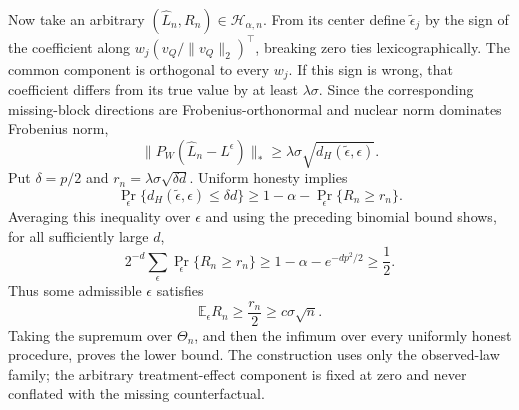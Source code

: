 Now take an arbitrary \((\widehat L_n,R_n)\in\mathcal H_{\alpha,n}\).  From its center define \(\widetilde\epsilon_j\) by the sign of the coefficient along
\(w_j(v_Q/\lVert v_Q\rVert_2)^{\top}\), breaking zero ties lexicographically.  The common component is orthogonal to every \(w_j\).  If this sign is wrong, that coefficient differs from its true value by at least \(\lambda\sigma\).  Since the corresponding missing-block directions are Frobenius-orthonormal and nuclear norm dominates Frobenius norm,
\[
\lVert P_W(\widehat L_n-L^\epsilon)\rVert_*
\ge\lambda\sigma\sqrt{d_H(\widetilde\epsilon,\epsilon)}.
\]
Put \(\delta=p/2\) and \(r_n=\lambda\sigma\sqrt{\delta d}\).  Uniform honesty implies
\[
\Pr_\epsilon\{d_H(\widetilde\epsilon,\epsilon)\le\delta d\}
\ge1-\alpha-\Pr_\epsilon\{R_n\ge r_n\}.
\]
Averaging this inequality over \(\epsilon\) and using the preceding binomial bound shows, for all sufficiently large \(d\),
\[
2^{-d}\sum_\epsilon\Pr_\epsilon\{R_n\ge r_n\}
\ge1-\alpha-e^{-dp^2/2}\ge\frac12.
\]
Thus some admissible \(\epsilon\) satisfies
\[
\mathbb E_\epsilon R_n\ge\frac{r_n}{2}
\ge c\sigma\sqrt n.
\]
Taking the supremum over \(\Theta_n\), and then the infimum over every uniformly honest procedure, proves the lower bound.  The construction uses only the observed-law family; the arbitrary treatment-effect component is fixed at zero and never conflated with the missing counterfactual.
